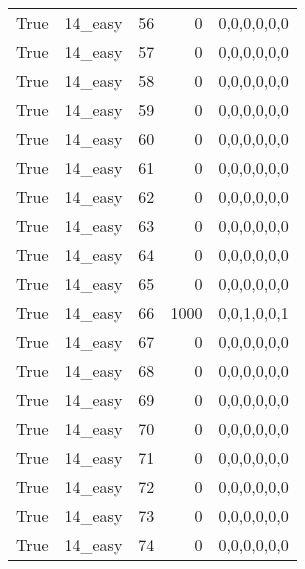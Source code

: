 \begin{tabular}{llrrl}
 True            & 14\_easy             &            56 &                     0 & 0,0,0,0,0,0   \\
 True            & 14\_easy             &            57 &                     0 & 0,0,0,0,0,0   \\
 True            & 14\_easy             &            58 &                     0 & 0,0,0,0,0,0   \\
 True            & 14\_easy             &            59 &                     0 & 0,0,0,0,0,0   \\
 True            & 14\_easy             &            60 &                     0 & 0,0,0,0,0,0   \\
 True            & 14\_easy             &            61 &                     0 & 0,0,0,0,0,0   \\
 True            & 14\_easy             &            62 &                     0 & 0,0,0,0,0,0   \\
 True            & 14\_easy             &            63 &                     0 & 0,0,0,0,0,0   \\
 True            & 14\_easy             &            64 &                     0 & 0,0,0,0,0,0   \\
 True            & 14\_easy             &            65 &                     0 & 0,0,0,0,0,0   \\
 True            & 14\_easy             &            66 &                  1000 & 0,0,1,0,0,1   \\
 True            & 14\_easy             &            67 &                     0 & 0,0,0,0,0,0   \\
 True            & 14\_easy             &            68 &                     0 & 0,0,0,0,0,0   \\
 True            & 14\_easy             &            69 &                     0 & 0,0,0,0,0,0   \\
 True            & 14\_easy             &            70 &                     0 & 0,0,0,0,0,0   \\
 True            & 14\_easy             &            71 &                     0 & 0,0,0,0,0,0   \\
 True            & 14\_easy             &            72 &                     0 & 0,0,0,0,0,0   \\
 True            & 14\_easy             &            73 &                     0 & 0,0,0,0,0,0   \\
 True            & 14\_easy             &            74 &                     0 & 0,0,0,0,0,0   \\

\end{tabular}
